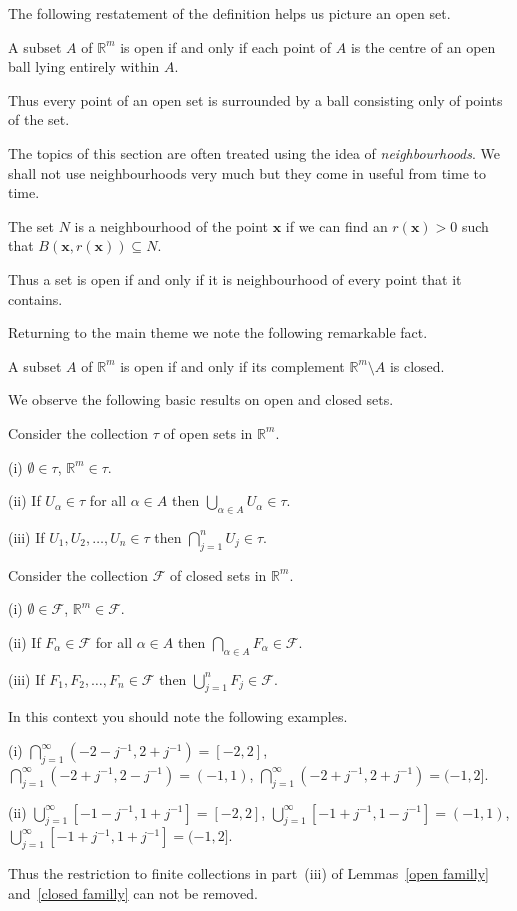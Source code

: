 The following restatement of the
definition helps us picture an open set.
\begin{lemma} A subset $A$ of ${\mathbb R}^{m}$ is open
if and only if each point of $A$ is the centre of
an open ball lying entirely within $A$.
\end{lemma}
Thus every point of an open set is surrounded by a ball
consisting only of points of the set.

The topics of this section are often treated
using the idea of \emph{neighbourhoods}. We shall
not use neighbourhoods very much but 
they come in useful from time to time.
\begin{definition} The set $N$ is a neighbourhood
of the point ${\mathbf x}$ if we can find an $r({\mathbf x})>0$
such that $B({\mathbf x},r({\mathbf x}))\subseteq N$.
\end{definition}
Thus a set is open if and only if it is neighbourhood
of every point that it contains.

Returning to the main theme we note the following
remarkable fact.
\begin{lemma}\label{complement open}
A subset $A$ of ${\mathbb R}^{m}$ is open
if and only if its complement ${\mathbb R}^{m}\setminus A$
is closed.
\end{lemma}
We observe the following basic results on open and closed sets.

\begin{lemma}\label{open familly} 
Consider the collection $\tau$ of open sets
in ${\mathbb R}^{m}$.

(i) $\emptyset\in\tau$, ${\mathbb R}^{m}\in \tau$.

(ii)  If $U_{\alpha}\in\tau$ for all $\alpha\in A$ then
$\bigcup_{\alpha\in A} U_{\alpha}\in\tau$.

(iii) If $U_{1},U_{2},\dots,U_{n}\in\tau$ then
$\bigcap_{j=1}^{n}U_{j}\in\tau$.
\end{lemma}
\begin{lemma}\label{closed familly}
Consider the collection $\mathcal{F}$ of closed sets
in ${\mathbb R}^{m}$.

(i) $\emptyset\in\mathcal{F}$, ${\mathbb R}^{m}\in \mathcal{F}$.

(ii)  If $F_{\alpha}\in\mathcal{F}$ for all $\alpha\in A$ then
$\bigcap_{\alpha\in A} F_{\alpha}\in\mathcal{F}$.

(iii) If $F_{1},F_{2},\dots,F_{n}\in\mathcal{F}$ then
$\bigcup_{j=1}^{n}F_{j}\in\mathcal{F}$.
\end{lemma}
In this context you should note the following examples.
\begin{example} (i) $\bigcap_{j=1}^{\infty}(-2-j^{-1},2+j^{-1})
=[-2,2]$, $\bigcap_{j=1}^{\infty}(-2+j^{-1},2-j^{-1})
=(-1,1)$, $\bigcap_{j=1}^{\infty}(-2+j^{-1},2+j^{-1})=(-1,2]$.

(ii) $\bigcup_{j=1}^{\infty}[-1-j^{-1},1+j^{-1}]
=[-2,2]$, $\bigcup_{j=1}^{\infty}[-1+j^{-1},1-j^{-1}]
=(-1,1)$, $\bigcup_{j=1}^{\infty}[-1+j^{-1},1+j^{-1}]=(-1,2]$.
\end{example}
Thus the restriction to finite collections
in part~(iii) of Lemmas~\ref{open familly}
and~\ref{closed familly} can not be removed.

